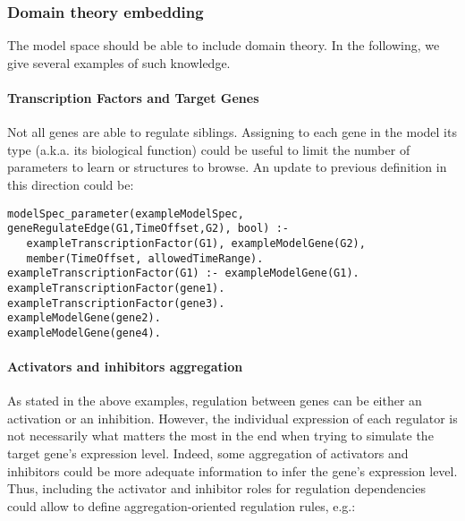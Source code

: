 \documentclass{article}
\begin{document}
\subsubsection{Domain theory embedding}

The model space should be able to include domain theory. In the following, we give several examples of such knowledge.

\paragraph{Transcription Factors and Target Genes}

Not all genes are able to regulate siblings. Assigning to each gene in the model its type (a.k.a. its biological function) could be useful to limit the number of parameters to learn or structures to browse. An update to previous definition in this direction could be:

\begin{verbatim}
modelSpec_parameter(exampleModelSpec, geneRegulateEdge(G1,TimeOffset,G2), bool) :-
   exampleTranscriptionFactor(G1), exampleModelGene(G2), 
   member(TimeOffset, allowedTimeRange).
exampleTranscriptionFactor(G1) :- exampleModelGene(G1).
exampleTranscriptionFactor(gene1).
exampleTranscriptionFactor(gene3).
exampleModelGene(gene2).
exampleModelGene(gene4).
\end{verbatim}

\paragraph{Activators and inhibitors aggregation}

As stated in the above examples, regulation between genes can be either an activation or an inhibition. However, the individual expression of each regulator is not necessarily what matters the most in the end when trying to simulate the target gene's expression level.
Indeed, some aggregation of activators and inhibitors could be more adequate information to infer the gene's expression level. Thus, including the activator and inhibitor roles for regulation dependencies could allow to define aggregation-oriented regulation rules, e.g.:
\end{document}

